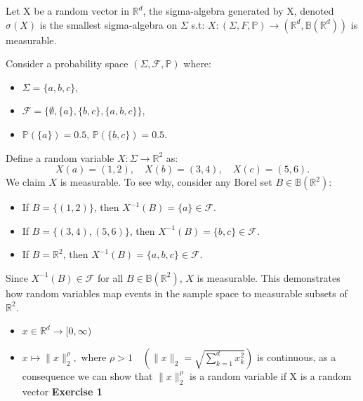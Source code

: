 \documentclass{article}
\begin{document}
\begin{definition}
    Let X be a random vector in $\mathbb{R}^{d}$, the sigma-algebra generated by X, denoted $\sigma(X)$ is the smallest sigma-algebra on $\Sigma$ s.t: \(X:(\Sigma, F, \mathbb{P})\rightarrow (\mathbb{R}^{d}, \mathbb{B}(\mathbb{R}^{d}))\) is measurable.
\end{definition}

\begin{example}
    Consider a probability space \((\Sigma, \mathcal{F}, \mathbb{P})\) where:
    \begin{itemize}
        \item \(\Sigma = \{a, b, c\}\),
        \item \(\mathcal{F} = \{\emptyset, \{a\}, \{b, c\}, \{a, b, c\}\}\),
        \item \(\mathbb{P}(\{a\}) = 0.5\), \(\mathbb{P}(\{b, c\}) = 0.5\).
    \end{itemize}
    Define a random variable \(X : \Sigma \to \mathbb{R}^2\) as:
    \[
    X(a) = (1, 2), \quad X(b) = (3, 4), \quad X(c) = (5, 6).
    \]
    We claim \(X\) is measurable. To see why, consider any Borel set \(B \in \mathbb{B}(\mathbb{R}^2)\):
    \begin{itemize}
        \item If \(B = \{(1, 2)\}\), then \(X^{-1}(B) = \{a\} \in \mathcal{F}\).
        \item If \(B = \{(3, 4), (5, 6)\}\), then \(X^{-1}(B) = \{b, c\} \in \mathcal{F}\).
        \item If \(B = \mathbb{R}^2\), then \(X^{-1}(B) = \{a, b, c\} \in \mathcal{F}\).
    \end{itemize}
    Since \(X^{-1}(B) \in \mathcal{F}\) for all \(B \in \mathbb{B}(\mathbb{R}^2)\), \(X\) is measurable. This demonstrates how random variables map events in the sample space to measurable subsets of \(\mathbb{R}^2\).
    \end{example}


\begin{remark}
    \begin{itemize}
        \item  \(x \in \mathbb{R}^{d} \rightarrow [0, \infty)\)
        \item \(x \mapsto \|x\|_{2}^{\rho}, \text{ where } \rho > 1 
        \quad \left( 
        \|x\|_{2} = \sqrt{\sum_{k=1}^{d} x_k^2} 
        \right)\) is continuous, as a consequence we can show that \( \|x\|_{2}^{\rho}\) is a random variable if X is a random vector \textbf{Exercise 1}
    \end{itemize}
\end{remark}
\end{document}
